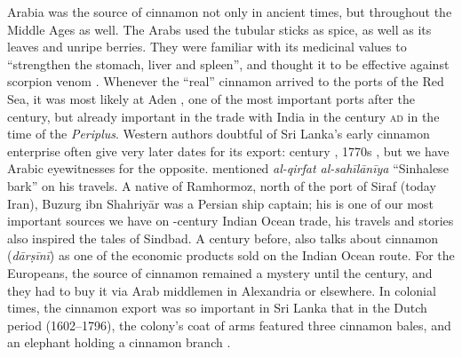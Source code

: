 Arabia was the source of cinnamon not only in ancient times, but throughout the Middle Ages as well. The Arabs used the tubular sticks as spice, as well as its leaves and unripe berries. They were familiar with its medicinal values to ``strengthen the stomach, liver and spleen'', and thought it to be effective against scorpion venom \autocite{dietrich_dar_2004}. Whenever the ``real'' cinnamon arrived to the ports of the Red Sea, it was most likely at Aden \autocite{dietrich_dar_2004}, one of the most important ports after the  century, but already important in the trade with India in the  century \textsc{ad} in the time of the \textit{Periplus}. 
Western authors doubtful of Sri Lanka's early cinnamon enterprise often give very later dates for its export:  century \autocite{dietrich_dar_2004}, 1770s \autocites[referring to William Dymock]{alam_darcini_2011}, but we have Arabic eyewitnesses for the opposite. \textcite[126]{buzurg_ibn_shahriyar_kitab_1908} mentioned \textit{al-qirfat al-sahīlānīya} ``Sinhalese bark'' on his travels. A native of Ramhormoz, north of the port of Siraf (today Iran), Buzurg ibn Shahriyār was a Persian ship captain; his  is one of our most important sources we have on -century Indian Ocean trade, his travels and stories also inspired the tales of Sindbad. A century before, \autocite{ibn_khurdadhbih_kitab_870} also talks about cinnamon (\textit{dārṣīnī}) as one of the economic products sold on the Indian Ocean route. For the Europeans, the source of cinnamon remained a mystery until the  century, and they had to buy it via Arab middlemen in Alexandria or elsewhere. In colonial times, the cinnamon export was so important in Sri Lanka that in the Dutch period (1602–1796), the colony's coat of arms featured three cinnamon bales, and an elephant holding a cinnamon branch \autocite{hartemink_national_1995}.





